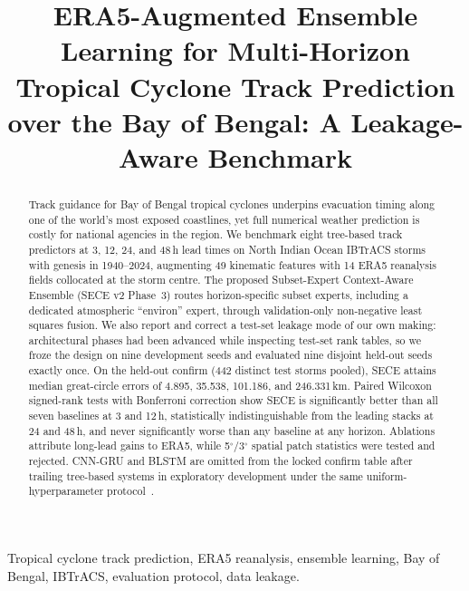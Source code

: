 \documentclass[conference]{IEEEtran}
\newcommand{\sece}{SECE}
\newcommand{\bob}{Bay of Bengal}
\newcommand{\era}{ERA5}
\newcommand{\ibtracs}{IBTrACS}
\begin{document}
\title{ERA5-Augmented Ensemble Learning for Multi-Horizon Tropical Cyclone
Track Prediction over the Bay of Bengal: A Leakage-Aware Benchmark}

\author{}

\maketitle

\begin{abstract}
Track guidance for \bob{} tropical cyclones underpins evacuation timing along one
of the world's most exposed coastlines, yet full numerical weather prediction is
costly for national agencies in the region. We benchmark eight tree-based track
predictors at 3, 12, 24, and 48\,h lead times on North Indian Ocean \ibtracs{}
storms with genesis in 1940--2024, augmenting 49 kinematic features with 14
\era{} reanalysis fields collocated at the storm centre. The proposed
Subset-Expert Context-Aware Ensemble (\sece{} v2 Phase~3) routes horizon-specific
subset experts, including a dedicated atmospheric ``environ'' expert, through
validation-only non-negative least squares fusion. We also report and correct a
test-set leakage mode of our own making: architectural phases had been advanced
while inspecting test-set rank tables, so we froze the design on nine development
seeds and evaluated nine disjoint held-out seeds exactly once. On the held-out
confirm (442 distinct test storms pooled), \sece{} attains median great-circle
errors of 4.895, 35.538, 101.186, and 246.331\,km. Paired Wilcoxon signed-rank
tests with Bonferroni correction show \sece{} is significantly better than all
seven baselines at 3 and 12\,h, statistically indistinguishable from the leading
stacks at 24 and 48\,h, and never significantly worse than any baseline at any
horizon. Ablations attribute long-lead gains to \era{}, while 5$^\circ$/3$^\circ$
spatial patch statistics were tested and rejected. CNN-GRU and BLSTM are omitted
from the locked confirm table after trailing tree-based systems in exploratory
development under the same uniform-hyperparameter protocol~\cite{grinsztajn2022tree}.
\end{abstract}

\begin{IEEEkeywords}
Tropical cyclone track prediction, ERA5 reanalysis, ensemble learning, Bay of
Bengal, IBTrACS, evaluation protocol, data leakage.
\end{IEEEkeywords}
\end{document}
